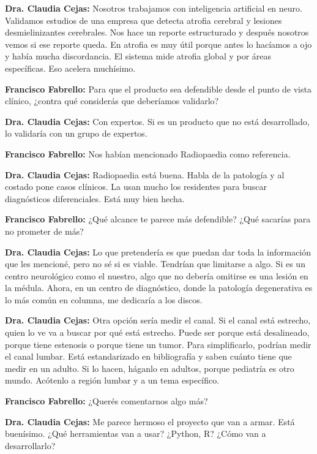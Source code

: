 \noindent\textbf{Dra. Claudia Cejas:} Nosotros trabajamos con inteligencia artificial en neuro. Validamos estudios de una empresa que detecta atrofia cerebral y lesiones desmielinizantes cerebrales. Nos hace un reporte estructurado y después nosotros vemos si ese reporte queda. En atrofia es muy útil porque antes lo hacíamos a ojo y había mucha discordancia. El sistema mide atrofia global y por áreas específicas. Eso acelera muchísimo.

\noindent\textbf{Francisco Fabrello:} Para que el producto sea defendible desde el punto de vista clínico, ¿contra qué considerás que deberíamos validarlo?

\noindent\textbf{Dra. Claudia Cejas:} Con expertos. Si es un producto que no está desarrollado, lo validaría con un grupo de expertos.

\noindent\textbf{Francisco Fabrello:} Nos habían mencionado Radiopaedia como referencia.

\noindent\textbf{Dra. Claudia Cejas:} Radiopaedia está buena. Habla de la patología y al costado pone casos clínicos. La usan mucho los residentes para buscar diagnósticos diferenciales. Está muy bien hecha.

\noindent\textbf{Francisco Fabrello:} ¿Qué alcance te parece más defendible? ¿Qué sacarías para no prometer de más?

\noindent\textbf{Dra. Claudia Cejas:} Lo que pretendería es que puedan dar toda la información que les mencioné, pero no sé si es viable. Tendrían que limitarse a algo. Si es un centro neurológico como el nuestro, algo que no debería omitirse es una lesión en la médula. Ahora, en un centro de diagnóstico, donde la patología degenerativa es lo más común en columna, me dedicaría a los discos.

\noindent\textbf{Dra. Claudia Cejas:} Otra opción sería medir el canal. Si el canal está estrecho, quien lo ve va a buscar por qué está estrecho. Puede ser porque está desalineado, porque tiene estenosis o porque tiene un tumor. Para simplificarlo, podrían medir el canal lumbar. Está estandarizado en bibliografía y saben cuánto tiene que medir en un adulto. Si lo hacen, háganlo en adultos, porque pediatría es otro mundo. Acótenlo a región lumbar y a un tema específico.

\noindent\textbf{Francisco Fabrello:} ¿Querés comentarnos algo más?

\noindent\textbf{Dra. Claudia Cejas:} Me parece hermoso el proyecto que van a armar. Está buenísimo. ¿Qué herramientas van a usar? ¿Python, R? ¿Cómo van a desarrollarlo?

